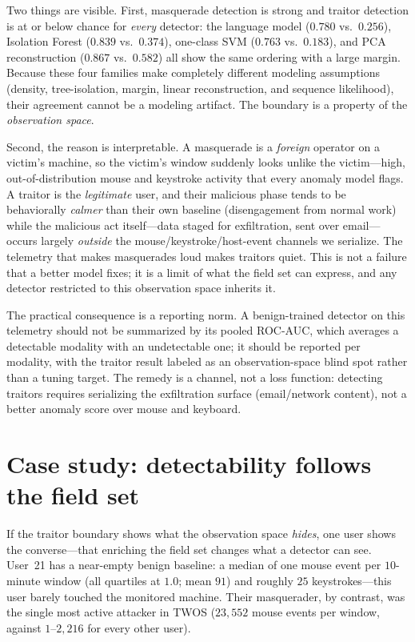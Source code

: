 \documentclass[10pt]{article}
\begin{document}
Two things are visible. First, masquerade detection is strong and traitor
detection is at or below chance for \emph{every} detector: the language model
($0.780$ vs.\ $0.256$), Isolation Forest ($0.839$ vs.\ $0.374$), one-class SVM
($0.763$ vs.\ $0.183$), and PCA reconstruction ($0.867$ vs.\ $0.582$) all show
the same ordering with a large margin. Because these four families make
completely different modeling assumptions (density, tree-isolation, margin,
linear reconstruction, and sequence likelihood), their agreement cannot be a
modeling artifact. The boundary is a property of the \emph{observation space}.

Second, the reason is interpretable. A masquerade is a \emph{foreign} operator
on a victim's machine, so the victim's window suddenly looks unlike the
victim---high, out-of-distribution mouse and keystroke activity that every
anomaly model flags. A traitor is the \emph{legitimate} user, and their
malicious phase tends to be behaviorally \emph{calmer} than their own baseline
(disengagement from normal work) while the malicious act itself---data
staged for exfiltration, sent over email---occurs largely \emph{outside} the
mouse/keystroke/host-event channels we serialize. The telemetry that makes
masquerades loud makes traitors quiet. This is not a failure that a better
model fixes; it is a limit of what the field set can express, and any detector
restricted to this observation space inherits it.

The practical consequence is a reporting norm. A benign-trained detector on
this telemetry should not be summarized by its pooled ROC-AUC, which averages a
detectable modality with an undetectable one; it should be reported per
modality, with the traitor result labeled as an observation-space blind spot
rather than a tuning target. The remedy is a channel, not a loss function:
detecting traitors requires serializing the exfiltration surface (email/network
content), not a better anomaly score over mouse and keyboard.

\section{Case study: detectability follows the field set}

If the traitor boundary shows what the observation space \emph{hides}, one user
shows the converse---that enriching the field set changes what a detector can
see. User~21 has a near-empty benign baseline: a median of one mouse event per
$10$-minute window (all quartiles at $1.0$; mean $91$) and roughly $25$
keystrokes---this user barely touched the monitored machine. Their masquerader,
by contrast, was the single most active attacker in TWOS ($23{,}552$ mouse
events per window, against $1$--$2{,}216$ for every other user).
\end{document}
